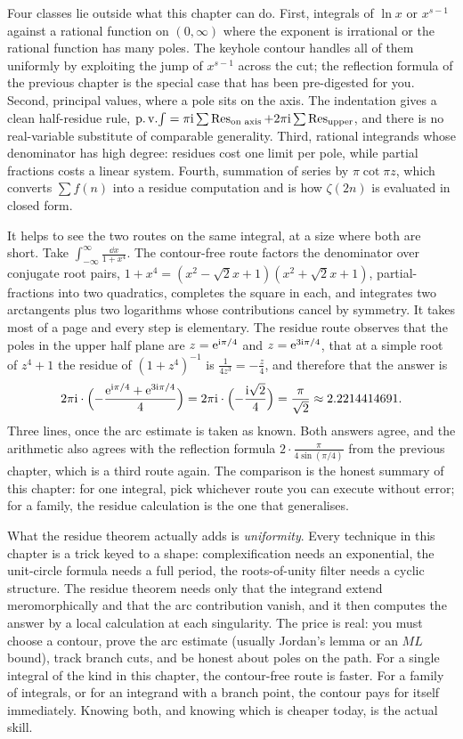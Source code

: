 Four classes lie outside what this chapter can do. First, integrals of $\ln x$ or $x^{s-1}$ against a rational function on $(0,\infty)$ where the exponent is irrational or the rational function has many poles. The keyhole contour handles all of them uniformly by exploiting the jump of $x^{s-1}$ across the cut; the reflection formula of the previous chapter is the special case that has been pre-digested for you. Second, principal values, where a pole sits on the axis. The indentation gives a clean half-residue rule, $\operatorname{p.v.}\!\int=\pi\mathrm{i}\sum\operatorname{Res}_{\text{on axis}}+2\pi\mathrm{i}\sum\operatorname{Res}_{\text{upper}}$, and there is no real-variable substitute of comparable generality. Third, rational integrands whose denominator has high degree: residues cost one limit per pole, while partial fractions costs a linear system. Fourth, summation of series by $\pi\cot\pi z$, which converts $\sum f(n)$ into a residue computation and is how $\zeta(2n)$ is evaluated in closed form.

It helps to see the two routes on the same integral, at a size where both are short. Take $\int_{-\infty}^{\infty}\frac{\dd x}{1+x^{4}}$. The contour-free route factors the denominator over conjugate root pairs, $1+x^{4}=(x^{2}-\sqrt2x+1)(x^{2}+\sqrt2x+1)$, partial-fractions into two quadratics, completes the square in each, and integrates two arctangents plus two logarithms whose contributions cancel by symmetry. It takes most of a page and every step is elementary. The residue route observes that the poles in the upper half plane are $z=\mathrm{e}^{\mathrm{i}\pi/4}$ and $z=\mathrm{e}^{3\mathrm{i}\pi/4}$, that at a simple root of $z^{4}+1$ the residue of $(1+z^{4})^{-1}$ is $\tfrac{1}{4z^{3}}=-\tfrac z4$, and therefore that the answer is
\[2\pi\mathrm{i}\cdot\Bigl(-\frac{\mathrm{e}^{\mathrm{i}\pi/4}+\mathrm{e}^{3\mathrm{i}\pi/4}}{4}\Bigr)=2\pi\mathrm{i}\cdot\Bigl(-\frac{\mathrm{i}\sqrt2}{4}\Bigr)=\frac{\pi}{\sqrt2}\approx2.2214414691.\]
Three lines, once the arc estimate is taken as known. Both answers agree, and the arithmetic also agrees with the reflection formula $2\cdot\frac{\pi}{4\sin(\pi/4)}$ from the previous chapter, which is a third route again. The comparison is the honest summary of this chapter: for one integral, pick whichever route you can execute without error; for a family, the residue calculation is the one that generalises.

\begin{keynote}
What the residue theorem actually adds is \emph{uniformity}. Every technique in this chapter is a trick keyed to a shape: complexification needs an exponential, the unit-circle formula needs a full period, the roots-of-unity filter needs a cyclic structure. The residue theorem needs only that the integrand extend meromorphically and that the arc contribution vanish, and it then computes the answer by a local calculation at each singularity. The price is real: you must choose a contour, prove the arc estimate (usually Jordan's lemma or an $ML$ bound), track branch cuts, and be honest about poles on the path. For a single integral of the kind in this chapter, the contour-free route is faster. For a family of integrals, or for an integrand with a branch point, the contour pays for itself immediately. Knowing both, and knowing which is cheaper today, is the actual skill.
\end{keynote}

